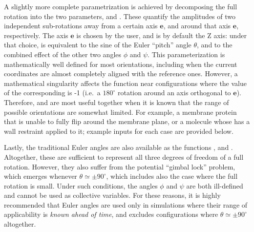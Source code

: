 A slightly more complete parametrization is achieved by decomposing the full rotation into the two parameters,  and .
These quantify the amplitudes of two independent sub-rotations away from a certain axis $\mathbf{e}$, and around that axis $\mathbf{e}$, respectively.
The axis $\mathbf{e}$ is chosen by the user, and is by default the Z axis:
under that choice,  is equivalent to the sine of the Euler ``pitch'' angle $\theta$, and  to the combined effect of the other two angles $\phi$ and $\psi$.
This parameterization is mathematically well defined for most orientations, including when the current coordinates are almost completely aligned with the reference ones.
However, a mathematical singularity affects the  function near configurations where the value of the corresponding  is -1 (i.e.\ a $180^\circ$ rotation around an axis orthogonal to $\mathbf{e}$).
Therefore,  and  are most useful together when it is known that the range of possible orientations are somewhat limited.
For example, a membrane protein that is unable to fully flip around the membrane plane, or a molecule whose  has a wall restraint applied to it; example inputs for each case are provided below.

Lastly, the traditional Euler angles are also available as the functions ,  and .
Altogether, these are sufficient to represent all three degrees of freedom of a full rotation.
However, they also suffer from the potential ``gimbal lock'' problem, which emerges whenever $\theta \simeq \pm 90^\circ$, which includes also the case where the full rotation is small.
Under such conditions, the angles $\phi$ and $\psi$ are both ill-defined and cannot be used as collective variables.
For these reasons, it is highly recommended that Euler angles are used only in simulations where their range of applicability is \emph{known ahead of time}, and excludes configurations where  $\theta \simeq \pm 90^\circ$ altogether.


